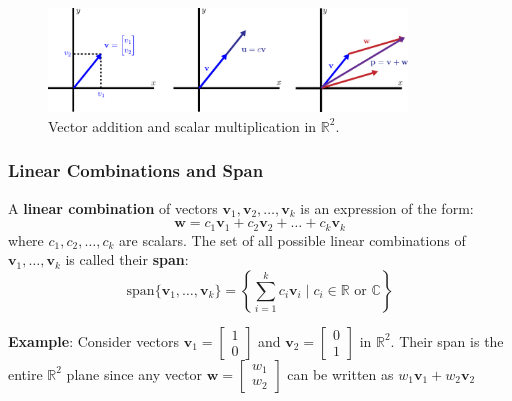 \begin{figure}[H]
    \centering
    \includegraphics[width=0.85\textwidth]{figs/linear-algebra/vector-operations.pdf}
    \caption{Vector addition and scalar multiplication in $ \mathbb{R}^2 $.}
    \label{fig:vector-operations}
\end{figure}

\subsubsection{Linear Combinations and Span}

A \textbf{linear combination} of vectors $ \mathbf{v}_1, \mathbf{v}_2, \ldots, \mathbf{v}_k $ is an expression of the form:
\begin{equation*}
    \mathbf{w} = c_1 \mathbf{v}_1 + c_2 \mathbf{v}_2 + \ldots + c_k \mathbf{v}_k
\end{equation*}
where $ c_1, c_2, \ldots, c_k $ are scalars. The set of all possible linear combinations of $ \mathbf{v}_1, \ldots, \mathbf{v}_k $ is called their \textbf{span}:
\begin{equation*}
    \text{span}\{\mathbf{v}_1, \ldots, \mathbf{v}_k\} = \left\{ \sum_{i=1}^k c_i \mathbf{v}_i \mid c_i \in \mathbb{R} \text{ or } \mathbb{C} \right\}
\end{equation*}

\begin{exampleBox}
    \textbf{Example}: Consider vectors $ \mathbf{v}_1 = \begin{bmatrix}1 \\ 0\end{bmatrix} $ and $ \mathbf{v}_2 = \begin{bmatrix}0 \\ 1\end{bmatrix} $ in $ \mathbb{R}^2 $. Their span is the entire $ \mathbb{R}^2 $ plane since any vector $ \mathbf{w} = \begin{bmatrix}w_1 \\ w_2\end{bmatrix} $ can be written as $ w_1 \mathbf{v}_1 + w_2 \mathbf{v}_2 $
\end{exampleBox}

